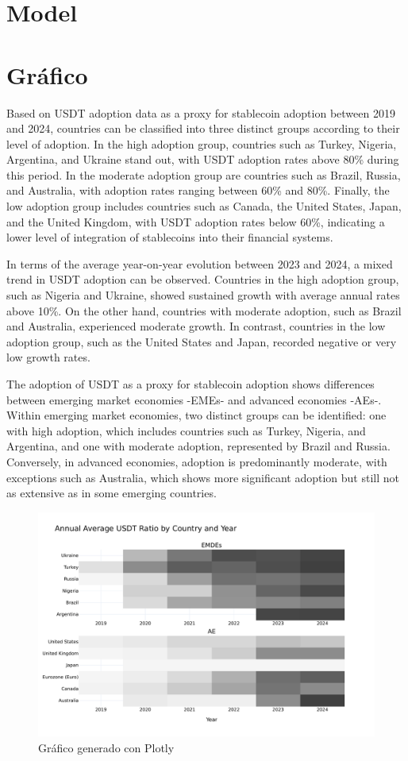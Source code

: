 \documentclass{article}
\begin{document}
\section{Model}


\section{Gráfico}

Based on USDT adoption data as a proxy for stablecoin adoption between 2019 and 2024, countries can be classified into three distinct groups according to their level of adoption. In the high adoption group, countries such as Turkey, Nigeria, Argentina, and Ukraine stand out, with USDT adoption rates above 80\% during this period. In the moderate adoption group are countries such as Brazil, Russia, and Australia, with adoption rates ranging between 60\% and 80\%. Finally, the low adoption group includes countries such as Canada, the United States, Japan, and the United Kingdom, with USDT adoption rates below 60\%, indicating a lower level of integration of stablecoins into their financial systems.

In terms of the average year-on-year evolution between 2023 and 2024, a mixed trend in USDT adoption can be observed. Countries in the high adoption group, such as Nigeria and Ukraine, showed sustained growth with average annual rates above 10\%. On the other hand, countries with moderate adoption, such as Brazil and Australia, experienced moderate growth. In contrast, countries in the low adoption group, such as the United States and Japan, recorded negative or very low growth rates. 

The adoption of USDT as a proxy for stablecoin adoption shows differences between emerging market economies -EMEs- and advanced economies -AEs-. Within emerging market economies, two distinct groups can be identified: one with high adoption, which includes countries such as Turkey, Nigeria, and Argentina, and one with moderate adoption, represented by Brazil and Russia. Conversely, in advanced economies, adoption is predominantly moderate, with exceptions such as Australia, which shows more significant adoption but still not as extensive as in some emerging countries. 

\begin{figure}[h]
    \centering
    \includegraphics[width=1\textwidth]{graphs/usdt_ratio.pdf} %
    \caption{Gráfico generado con Plotly}
    \label{fig:grafico}
\end{figure}
\end{document}
